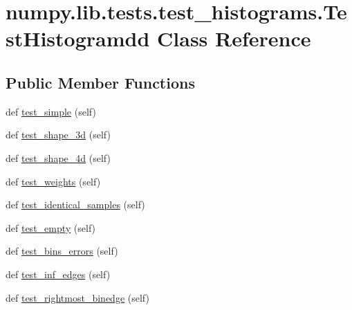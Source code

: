 \hypertarget{classnumpy_1_1lib_1_1tests_1_1test__histograms_1_1TestHistogramdd}{}\section{numpy.\+lib.\+tests.\+test\+\_\+histograms.\+Test\+Histogramdd Class Reference}
\label{classnumpy_1_1lib_1_1tests_1_1test__histograms_1_1TestHistogramdd}
\subsection*{Public Member Functions}
\begin{DoxyCompactItemize}
\item 
def \hyperlink{classnumpy_1_1lib_1_1tests_1_1test__histograms_1_1TestHistogramdd_a13d79e249fc2a4bc7878d6a33b0fff0e}{test\+\_\+simple} (self)
\item 
def \hyperlink{classnumpy_1_1lib_1_1tests_1_1test__histograms_1_1TestHistogramdd_a20be98115c77dca48cd5063d958401b4}{test\+\_\+shape\+\_\+3d} (self)
\item 
def \hyperlink{classnumpy_1_1lib_1_1tests_1_1test__histograms_1_1TestHistogramdd_a3c159d6d6288d2bd0f52b2c89151b1e9}{test\+\_\+shape\+\_\+4d} (self)
\item 
def \hyperlink{classnumpy_1_1lib_1_1tests_1_1test__histograms_1_1TestHistogramdd_a8eb7786da5d6e9fe860564d6f9163f89}{test\+\_\+weights} (self)
\item 
def \hyperlink{classnumpy_1_1lib_1_1tests_1_1test__histograms_1_1TestHistogramdd_a225df0876bc2a6096541cc75262793dc}{test\+\_\+identical\+\_\+samples} (self)
\item 
def \hyperlink{classnumpy_1_1lib_1_1tests_1_1test__histograms_1_1TestHistogramdd_ad66059f21f94fbbd18036945e2362c38}{test\+\_\+empty} (self)
\item 
def \hyperlink{classnumpy_1_1lib_1_1tests_1_1test__histograms_1_1TestHistogramdd_a658041fa4bb790fb6fa4ba4043851306}{test\+\_\+bins\+\_\+errors} (self)
\item 
def \hyperlink{classnumpy_1_1lib_1_1tests_1_1test__histograms_1_1TestHistogramdd_a3f989e9b43f6bf1ebe36d7f4df75d47c}{test\+\_\+inf\+\_\+edges} (self)
\item 
def \hyperlink{classnumpy_1_1lib_1_1tests_1_1test__histograms_1_1TestHistogramdd_a8bb4379b675f061f49e2aa638c1ffcd7}{test\+\_\+rightmost\+\_\+binedge} (self)
\item 

\end{DoxyCompactItemize}
